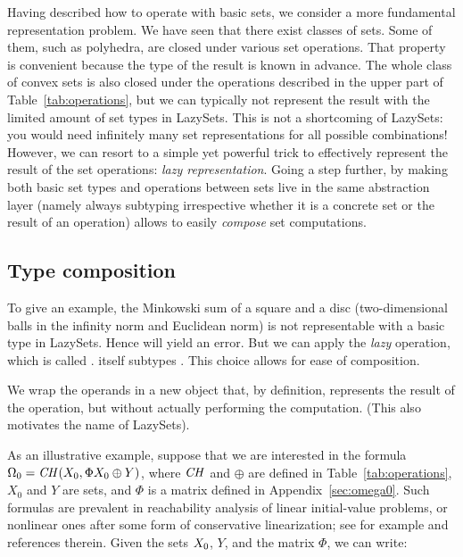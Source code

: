 Having described how to operate with basic sets, we consider a more fundamental representation problem.
%
We have seen that there exist classes of sets.
Some of them, such as polyhedra, are closed under various set operations. That property is convenient because the type of the result is known in advance.
%
The whole class of convex sets is also closed under the operations described in the upper part of Table~\ref{tab:operations}, but we can typically not represent the result with the limited amount of set types in LazySets. This is not a shortcoming of LazySets: you would need infinitely many set representations for all possible combinations! However, we can resort to a simple yet powerful trick to effectively represent the result of the set operations: \emph{lazy representation}.
%
Going a step further, by making both basic set types and operations between sets live in the same abstraction layer (namely always subtyping  irrespective whether it is a concrete set or the result of an operation) allows to easily \emph{compose} set computations.


\subsection{Type composition} \label{sec:composition}

To give an example, the Minkowski sum of a square and a disc (two-dimensional balls in the infinity norm and Euclidean norm) is not representable with a basic type in LazySets. Hence  will yield an error. But we can apply the \emph{lazy} operation, which is called .  itself subtypes . This choice allows for ease of composition.

We wrap the operands in a new object that, by definition, represents the result of the operation, but without actually performing the computation. (This also motivates the name of LazySets).

\smallskip

As an illustrative example, suppose that we are interested in the formula $\Omega_0 = \mathit{CH}(X_0, \Phi X_0 \oplus Y)$, where $\mathit{CH}$ and $\oplus$ are defined in Table~\ref{tab:operations}, $X_0$ and $Y$ are sets, and $\Phi$ is a matrix defined in Appendix~\ref{sec:omega0}. Such formulas are prevalent in reachability analysis of linear initial-value problems, or nonlinear ones after some form of conservative linearization; see for example \cite{althoff2020set,ForetsS21} and references therein. Given the sets $X_0$, $Y$, and the matrix $\Phi$, we can write:

